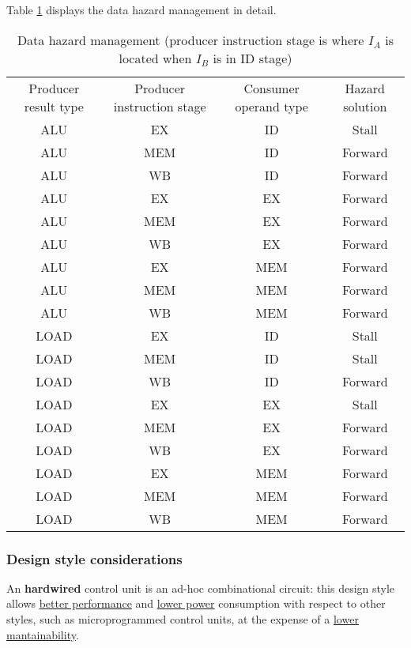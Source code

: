 \bigskip
Table \ref{tab:data_hazard} displays the data hazard management in detail.

\begin{table}[H]
	\centering
	\begin{tabular}{cccc}
		\hline
		\rowcolor{gray!50}
		Producer result type & Producer instruction stage &
			Consumer operand type & Hazard solution \\
		ALU &	EX &	ID &	Stall \\
		\rowcolor{gray!25}
		ALU &	MEM &	ID &	Forward \\
		ALU &	WB &	ID &	Forward \\
		\hdashline
		\rowcolor{gray!25}
		ALU & 	EX &	EX &	Forward \\
		ALU & 	MEM &	EX &	Forward \\
		\rowcolor{gray!25}
		ALU & 	WB &	EX &	Forward \\
		\hdashline
		ALU & 	EX &	MEM &	Forward \\
		\rowcolor{gray!25}
		ALU & 	MEM &	MEM &	Forward \\
		ALU & 	WB &	MEM &	Forward \\
		\hdashline
		\rowcolor{gray!25}
		LOAD & 	EX &	ID &	Stall \\
		LOAD & 	MEM &	ID &	Stall \\
		\rowcolor{gray!25}
		LOAD & 	WB &	ID &	Forward \\
		\hdashline
		LOAD & 	EX &	EX &	Stall \\
		\rowcolor{gray!25}
		LOAD & 	MEM &	EX &	Forward \\
		LOAD & 	WB &	EX &	Forward \\
		\hdashline
		\rowcolor{gray!25}
		LOAD & 	EX &	MEM &	Forward \\
		LOAD & 	MEM &	MEM &	Forward \\
		\rowcolor{gray!25}
		LOAD & 	WB &	MEM &	Forward \\
		\hline
	\end{tabular}
	\caption{Data hazard management (producer instruction stage is where
		$I_A$ is located when $I_B$ is in ID stage)}
	\label{tab:data_hazard}
\end{table}

\subsubsection{Design style considerations}
An \textbf{hardwired} control unit is an ad-hoc combinational circuit:
this design style allows \underline{better performance} and \underline{lower power}
consumption with respect to other styles, such as microprogrammed control units,
at the expense of a \underline{lower mantainability}.

